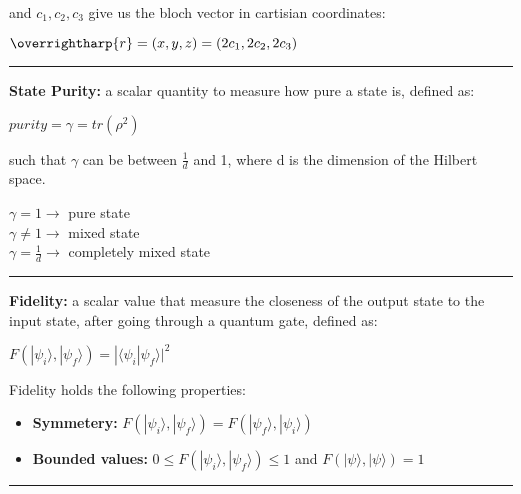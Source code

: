\documentclass{article}
\begin{document}
and  $c_{1}, c_{2}, c_{3}$ give us the bloch vector in cartisian coordinates:
\begin{center}
$\overrightharp{r} = (x, y, z) = (2c_{1}, 2c_{2}, 2c_{3})$
\end{center}


\vspace{5pt}
\hrule 
\vspace{5pt}


\textbf{State Purity:} a scalar quantity to measure how pure a state is, defined as:

\begin{center}
$ purity = \gamma = tr(\rho^2) $
\end{center}

such that $\gamma$ can be between $\frac{1}{d}$ and 1, where d is the dimension of the Hilbert space.

\begin{center}
$\gamma = 1 \rightarrow $ pure state \\
$\gamma \ne 1 \rightarrow $ mixed state \\
$\gamma = \frac{1}{d} \rightarrow $  completely mixed state
\end{center}

\vspace{5pt}
\hrule 
\vspace{5pt}


\textbf{Fidelity:} a scalar value that measure the closeness of the output state to the input state, after going through a quantum gate, defined as:

\begin{center}

$ F(|\psi_{i}\rangle, |\psi_{f}\rangle) = | \langle \psi_{i} | \psi_{f}\rangle | ^2 $ 

\end{center}

Fidelity holds the following properties:

\begin{itemize}
	\item \textbf{Symmetery:}  $ F(|\psi_{i}\rangle, |\psi_{f}\rangle) = F( |\psi_{f}\rangle, |\psi_{i}\rangle ) $
	\item \textbf{Bounded values:}  $ 0 \le F(|\psi_{i}\rangle, |\psi_{f}\rangle) \le 1$ and $ F(|\psi\rangle,|\psi\rangle) = 1 $
\end{itemize}

\vspace{5pt}
\hrule 
\vspace{5pt}
\end{document}
